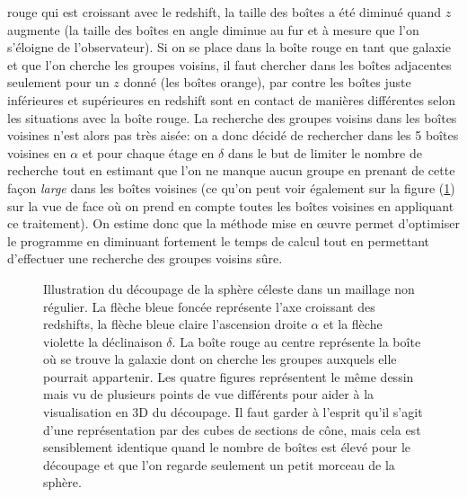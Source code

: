 rouge qui est croissant avec le redshift, la taille des boîtes a été diminué quand $z$ augmente (la taille des boîtes en angle
diminue au fur et à mesure que l'on s'éloigne de l'observateur). Si on se place dans la boîte rouge en tant que galaxie et que l'on
cherche les groupes voisins, il faut chercher dans les boîtes adjacentes seulement pour un $z$ donné (les boîtes orange), par
contre les boîtes juste inférieures et supérieures en redshift sont en contact de manières différentes selon les situations avec la
boîte rouge. La recherche des groupes voisins dans les boîtes voisines n'est alors pas très aisée: on a donc décidé de rechercher
dans les 5 boîtes voisines en $\alpha$ et pour chaque étage en $\delta$ dans le but de limiter le nombre de recherche tout en
estimant que l'on ne manque aucun groupe en prenant de cette façon \emph{large} dans les boîtes voisines (ce qu'on peut voir
également sur la figure (\ref{fig:dec}) sur la vue de face où on prend en compte toutes les boîtes voisines en appliquant ce
traitement). On estime donc que la méthode mise en {\oe}uvre permet d'optimiser le programme en diminuant fortement le temps de
calcul tout en permettant d'effectuer une recherche des groupes voisins sûre.
\begin{figure}[p]
	\centering
	\begin{minipage}{\linewidth}
	\end{minipage}
	\begin{minipage}{\linewidth}
	\end{minipage}
	\caption{\footnotesize{}Illustration du découpage de la sphère céleste dans un maillage non régulier. La flèche bleue
	foncée représente l'axe croissant des redshifts, la flèche bleue claire l'ascension droite $\alpha$ et la flèche violette
	la déclinaison $\delta$. La boîte rouge au centre représente la boîte où se trouve la galaxie dont on cherche les groupes
	auxquels elle pourrait appartenir. Les quatre figures représentent le même dessin mais vu de plusieurs points de vue
	différents pour aider à la visualisation en 3D du découpage. Il faut garder à l'esprit qu'il s'agit d'une représentation
	par des cubes de sections de cône, mais cela est sensiblement identique quand le nombre de boîtes est élevé pour le
	découpage et que l'on regarde seulement un petit morceau de la sphère.}
	\label{fig:dec}
\end{figure}

